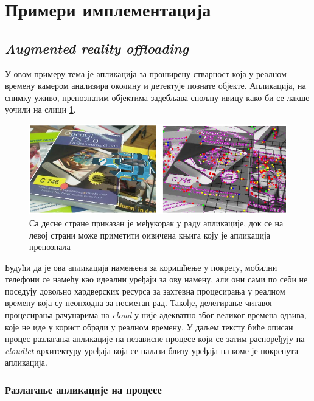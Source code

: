 \section{Примери имплементација}

\subsection{\textit{Augmented reality offloading}}

У овом примеру тема је апликација за проширену стварност која у реалном времену камером анализира околину и детектује познате објекте. Апликација, на снимку уживо, препознатим објектима задебљава спољну ивицу како би се лакше уочили на слици \ref{fig:ar_example}.

\begin{figure}[H]
    \centering
    \includegraphics[width=1\textwidth]{images/ar_example.png}
    \caption{Са десне стране приказан је међукорак у раду апликације, док се на левој страни може приметити оивичена књига коју је апликација препознала}
    \label{fig:ar_example}
\end{figure}

Будући да је ова апликација намењена за коришћење у покрету, мобилни телефони се намећу као идеални уређаји за ову намену, али они сами по себи не поседују довољно хардверских ресурса за захтевна процесирања у реалном времену која су неопходна за несметан рад. Такође, делегирање читавог процесирања рачунарима на \textit{cloud}-у није адекватно због великог времена одзива, које не иде у корист обради у реалном времену. У даљем тексту биће описан процес разлагања апликације на независне процесе који се затим распоређују на \textit{cloudlet }aрхитектуру уређаја која се налази  близу уређаја на коме је покренута апликација.

\subsubsection{Разлагање апликације на процесе}


